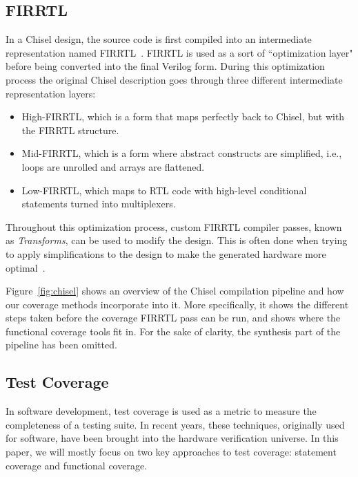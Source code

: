\documentclass[a4paper]{IEEEtran}
\begin{document}
\subsection{FIRRTL}
In a Chisel design, the source code is first compiled into an intermediate representation named FIRRTL~\cite{firrtl}.
FIRRTL is used as a sort of ``optimization layer" before being converted into the final Verilog form. 
During this optimization process the original Chisel description goes through three different intermediate representation layers:
\begin{itemize}
\item High-FIRRTL, which is a form that maps perfectly back to Chisel, but with the FIRRTL structure.
\item Mid-FIRRTL, which is a form where abstract constructs are simplified, i.e., loops are unrolled and arrays are flattened.
\item Low-FIRRTL, which maps to RTL code with high-level conditional statements turned into multiplexers.
\end{itemize}
Throughout this optimization process, custom FIRRTL compiler passes, known as \textit{Transforms}, can be used to modify the design. 
This is often done when trying to apply simplifications to the design to make the generated hardware more optimal~\cite{firrtl}.  

Figure~\ref{fig:chisel} shows an overview of the Chisel compilation pipeline and how our coverage methods incorporate into it. More specifically, it shows the different steps taken before the coverage FIRRTL pass can be run, and shows where the functional coverage tools fit in. For the sake of clarity, the synthesis part of the pipeline has been omitted.

\subsection{Test Coverage}
In software development, test coverage is used as a metric to measure the completeness of a testing suite. 
In recent years, these techniques, originally used for software, have been brought into the hardware verification universe. 
In this paper, we will mostly focus on two key approaches to test coverage: statement coverage and functional coverage. 
\end{document}
